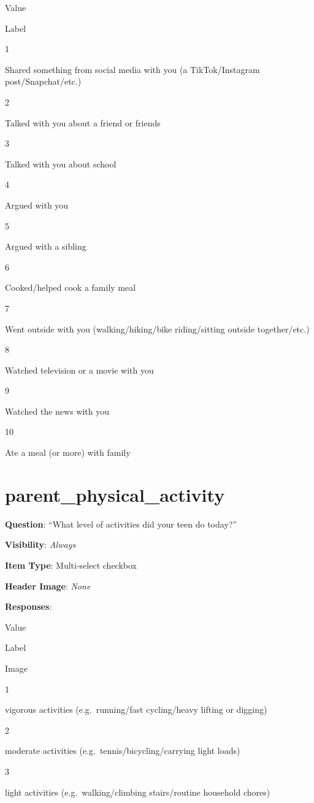 \documentclass[]{book}
\begin{document}
Value

Label

1

Shared something from social media with you (a TikTok/Instagram post/Snapchat/etc.)

2

Talked with you about a friend or friends

3

Talked with you about school

4

Argued with you

5

Argued with a sibling

6

Cooked/helped cook a family meal

7

Went outside with you (walking/hiking/bike riding/sitting outside together/etc.)

8

Watched television or a movie with you

9

Watched the news with you

10

Ate a meal (or more) with family

\hypertarget{parent_physical_activity}{%
\section{parent\_physical\_activity}\label{parent_physical_activity}}

\textbf{Question}: ``What level of activities did your teen do today?''

\textbf{Visibility}: \emph{Always}

\textbf{Item Type}: Multi-select checkbox

\textbf{Header Image}: \emph{None}

\textbf{Responses}:

Value

Label

Image

1

vigorous activities (e.g.~running/fast cycling/heavy lifting or digging)

2

moderate activities (e.g.~tennis/bicycling/carrying light loads)

3

light activities (e.g.~walking/climbing stairs/routine household chores)
\end{document}

